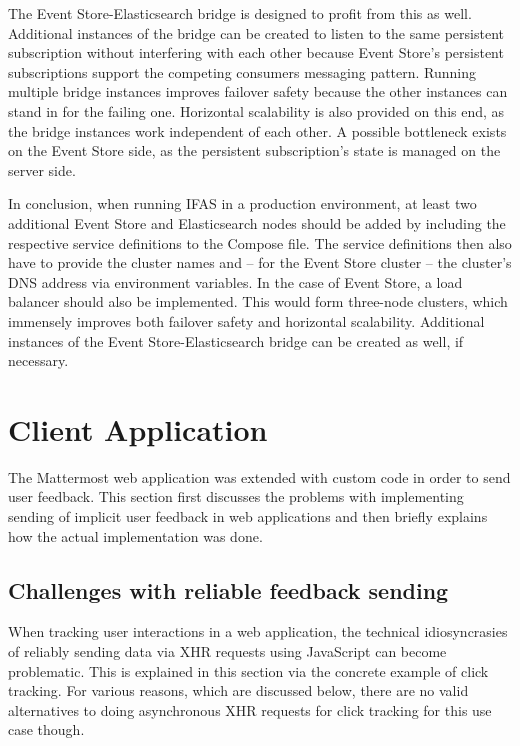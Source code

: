 The Event Store-Elasticsearch bridge is designed to profit from this as well.
Additional instances of the bridge can be created to listen to the same persistent subscription without interfering with each other because Event Store's persistent subscriptions support the competing consumers messaging pattern.
Running multiple bridge instances improves failover safety because the other instances can stand in for the failing one.
Horizontal scalability is also provided on this end, as the bridge instances work independent of each other.
A possible bottleneck exists on the Event Store side, as the persistent subscription's state is managed on the server side.

In conclusion, when running \ac{IFAS} in a production environment, at least two additional Event Store and Elasticsearch nodes should be added by including the respective service definitions to the Compose file.
The service definitions then also have to provide the cluster names and -- for the Event Store cluster -- the cluster's DNS address via environment variables.
In the case of Event Store, a load balancer should also be implemented.
This would form three-node clusters, which immensely improves both failover safety and horizontal scalability.
Additional instances of the Event Store-Elasticsearch bridge can be created as well, if necessary.

\section{Client Application}
\label{sec:implementation:client}

The Mattermost web application was extended with custom code in order to send user feedback.
This section first discusses the problems with implementing sending of implicit user feedback in web applications and then briefly explains how the actual implementation was done.

\subsection{Challenges with reliable feedback sending}
\label{subsec:implementation:client:problems}

When tracking user interactions in a web application, the technical idiosyncrasies of reliably sending data via \ac{XHR} requests using JavaScript can become problematic.
This is explained in this section via the concrete example of click tracking.
For various reasons, which are discussed below, there are no valid alternatives to doing asynchronous \ac{XHR} requests for click tracking for this use case though.

